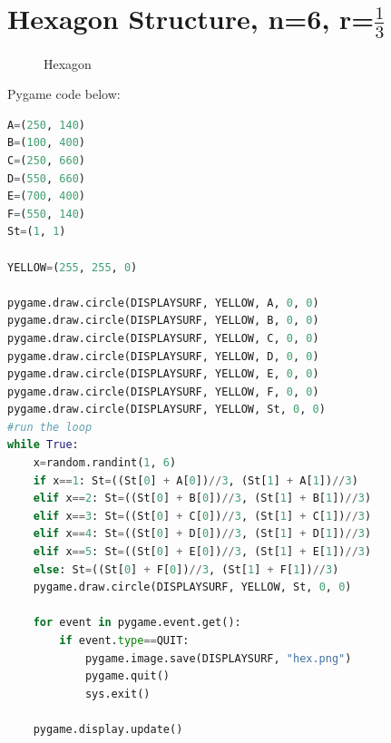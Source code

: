 \documentclass{article}
\begin{document}
\section{Hexagon Structure, n=6, r=$\frac{1}{3}$}
\begin{figure}[H]
\centering 
\noindent{}%
\caption{Hexagon}
\end{figure}
Pygame code below:
\begin{lstlisting}[language=Python, frame=single]
A=(250, 140)
B=(100, 400)
C=(250, 660)
D=(550, 660)
E=(700, 400)
F=(550, 140)
St=(1, 1)

YELLOW=(255, 255, 0)

pygame.draw.circle(DISPLAYSURF, YELLOW, A, 0, 0)
pygame.draw.circle(DISPLAYSURF, YELLOW, B, 0, 0)
pygame.draw.circle(DISPLAYSURF, YELLOW, C, 0, 0)
pygame.draw.circle(DISPLAYSURF, YELLOW, D, 0, 0)
pygame.draw.circle(DISPLAYSURF, YELLOW, E, 0, 0)
pygame.draw.circle(DISPLAYSURF, YELLOW, F, 0, 0)
pygame.draw.circle(DISPLAYSURF, YELLOW, St, 0, 0)
#run the loop
while True:
    x=random.randint(1, 6)
    if x==1: St=((St[0] + A[0])//3, (St[1] + A[1])//3)
    elif x==2: St=((St[0] + B[0])//3, (St[1] + B[1])//3)
    elif x==3: St=((St[0] + C[0])//3, (St[1] + C[1])//3)
    elif x==4: St=((St[0] + D[0])//3, (St[1] + D[1])//3)
    elif x==5: St=((St[0] + E[0])//3, (St[1] + E[1])//3)
    else: St=((St[0] + F[0])//3, (St[1] + F[1])//3)
    pygame.draw.circle(DISPLAYSURF, YELLOW, St, 0, 0)

    for event in pygame.event.get():
        if event.type==QUIT:
            pygame.image.save(DISPLAYSURF, "hex.png")
            pygame.quit()
            sys.exit()

    pygame.display.update()
\end{lstlisting}
\end{document}
